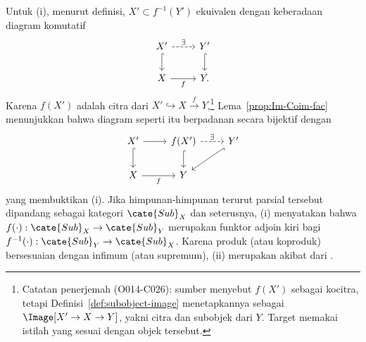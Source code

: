 \begin{bukti}
	Untuk (i), menurut definisi, $X'\subset f^{-1}(Y')$ ekuivalen dengan
	keberadaan diagram komutatif
	\[\begin{tikzcd}
		X' \arrow[dashed, r, "\exists"] \arrow[hookrightarrow, d] & Y' \arrow[hookrightarrow, d] \\
		X \arrow[r, "f"'] & Y .
	\end{tikzcd}\]
	Karena $f(X')$ adalah citra dari
	$X'\hookrightarrow X\xrightarrow{f}Y$,\footnote{Catatan penerjemah
	(O014-C026): sumber menyebut $f(X')$ sebagai kocitra, tetapi
	Definisi~\ref{def:subobject-image} menetapkannya sebagai
	$\Image[X'\to X\to Y]$, yakni citra dan subobjek dari $Y$. Target memakai
	istilah yang sesuai dengan objek tersebut.} Lema~\ref{prop:Im-Coim-fac}
	menunjukkan bahwa diagram seperti itu berpadanan secara bijektif dengan
	\[\begin{tikzcd}
		X' \arrow[r] \arrow[d, hookrightarrow] & f(X') \arrow[hookrightarrow, d] \arrow[dashed, r, "\exists"] & Y' \arrow[hookrightarrow, ld] \\
		X \arrow[r, "f"'] & Y &
	\end{tikzcd}\]
	yang membuktikan (i). Jika himpunan-himpunan terurut parsial tersebut
	dipandang sebagai kategori $\cate{Sub}_X$ dan seterusnya, (i) menyatakan
	bahwa $f(\cdot):\cate{Sub}_X\to\cate{Sub}_Y$ merupakan funktor adjoin kiri
	bagi $f^{-1}(\cdot):\cate{Sub}_Y\to\cate{Sub}_X$. Karena produk (atau
	koproduk) bersesuaian dengan infimum (atau supremum), (ii) merupakan
	akibat dari \cite[Teorema 2.8.12]{Li1}.
\end{bukti}

